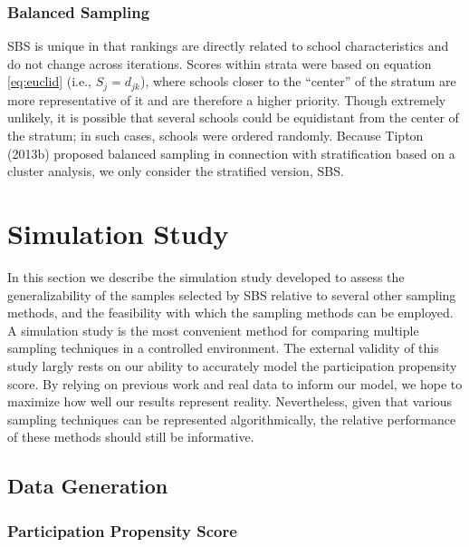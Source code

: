 \documentclass[man,floatsintext]{apa6}
\begin{document}
\hypertarget{balanced-sampling-1}{%
\subsubsection{Balanced Sampling}\label{balanced-sampling-1}}

SBS is unique in that rankings are directly related to school characteristics and do not change across iterations. Scores within strata were based on equation \eqref{eq:euclid} (i.e., \(S_j = d_{jk}\)), where schools closer to the \enquote{center} of the stratum are more representative of it and are therefore a higher priority. Though extremely unlikely, it is possible that several schools could be equidistant from the center of the stratum; in such cases, schools were ordered randomly.
Because Tipton (2013b) proposed balanced sampling in connection with stratification based on a cluster analysis, we only consider the stratified version, SBS.

\hypertarget{simulation-study}{%
\section{Simulation Study}\label{simulation-study}}

In this section we describe the simulation study developed to assess the generalizability of the samples selected by SBS relative to several other sampling methods, and the feasibility with which the sampling methods can be employed. A simulation study is the most convenient method for comparing multiple sampling techniques in a controlled environment. The external validity of this study largly rests on our ability to accurately model the participation propensity score. By relying on previous work and real data to inform our model, we hope to maximize how well our results represent reality. Nevertheless, given that various sampling techniques can be represented algorithmically, the relative performance of these methods should still be informative.

\hypertarget{data-generation}{%
\subsection{Data Generation}\label{data-generation}}

\hypertarget{participation-propensity-score}{%
\subsubsection{Participation Propensity Score}\label{participation-propensity-score}}
\end{document}
